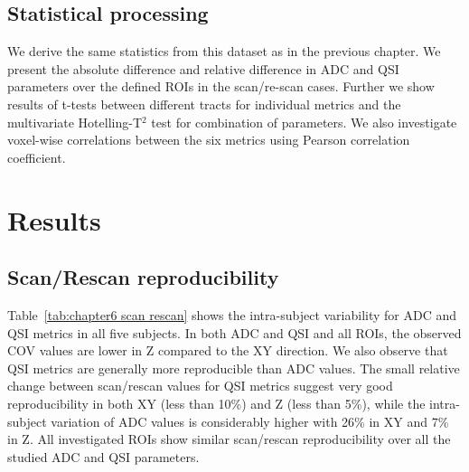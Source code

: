 \subsection*{Statistical processing} We derive the same statistics from this dataset as in the previous chapter. We present the absolute difference and relative difference in ADC and \gls{QSI} parameters over the defined \glspl{ROI} in the scan/re-scan cases. Further we show results of t-tests between different tracts for individual metrics and the multivariate Hotelling-T$^2$ test for combination of parameters. We also investigate voxel-wise correlations between the six metrics using Pearson correlation coefficient.


\section{Results}
\subsection*{Scan/Rescan reproducibility}
\label{par:chapter6 reproducibility}
Table~\ref{tab:chapter6 scan rescan} shows the intra-subject variability for ADC and QSI metrics in all five subjects. In both ADC and QSI and all \glspl{ROI}, the observed COV values are lower in Z compared to the XY direction. We also observe that QSI metrics are generally more reproducible than ADC values. The small relative change between scan/rescan values for QSI metrics suggest very good reproducibility in both XY (less than 10\%) and Z (less than 5\%), while the intra-subject variation of ADC values is considerably higher with 26\% in XY and 7\% in Z. All investigated \glspl{ROI} show similar scan/rescan reproducibility over all the studied ADC and QSI parameters.

